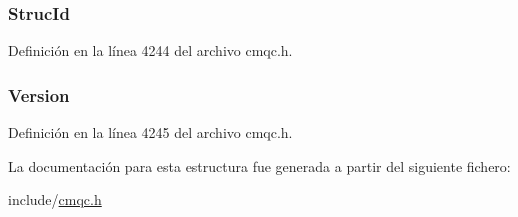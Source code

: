 \hypertarget{structtag_m_q_d_m_h_o_a0530922ca944569b52601d74941f96e4}{}
\subsubsection[{Struc\+Id}]{ Struc\+Id}\label{structtag_m_q_d_m_h_o_a0530922ca944569b52601d74941f96e4}


Definición en la línea 4244 del archivo cmqc.\+h.

\hypertarget{structtag_m_q_d_m_h_o_a0656ef8f766b3907d394d88a35d7b7e9}{}
\subsubsection[{Version}]{ Version}\label{structtag_m_q_d_m_h_o_a0656ef8f766b3907d394d88a35d7b7e9}


Definición en la línea 4245 del archivo cmqc.\+h.



La documentación para esta estructura fue generada a partir del siguiente fichero\+:\begin{DoxyCompactItemize}
\item 
include/\hyperlink{cmqc_8h}{cmqc.\+h}\end{DoxyCompactItemize}
